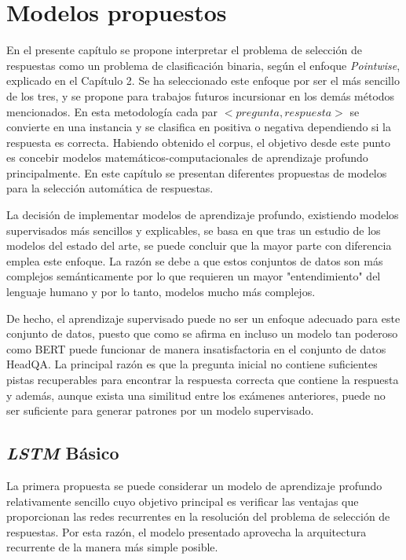 \chapter{Modelos propuestos}\label{chapter:models}

En el presente capítulo se propone interpretar el problema de selección de respuestas como un problema de clasificación binaria, según el enfoque \textit{Pointwise}, explicado en el Capítulo 2. Se ha seleccionado este enfoque por ser el más sencillo de los tres, y se propone para trabajos futuros incursionar en los demás métodos mencionados. En esta metodología cada par $<pregunta, respuesta>$ se convierte en una instancia y se clasifica en positiva o negativa dependiendo si la respuesta es correcta. Habiendo obtenido el corpus, el objetivo desde este punto es concebir modelos matemáticos-computacionales de aprendizaje profundo principalmente. En este capítulo se presentan diferentes propuestas de modelos para la selección automática de respuestas. 

La decisión de implementar modelos de aprendizaje profundo, existiendo modelos supervisados más sencillos y explicables, se basa en que tras un estudio de los modelos del estado del arte, se puede concluir que la mayor parte con diferencia emplea este enfoque. La razón se debe a que estos conjuntos de datos son más complejos semánticamente por lo que requieren un mayor "entendimiento" del lenguaje humano y por lo tanto, modelos mucho más complejos. 

De hecho, el aprendizaje supervisado puede no ser un enfoque adecuado para este conjunto de datos, puesto que como se afirma en \cite{2020-multi-step} incluso un modelo tan poderoso como BERT puede funcionar de manera insatisfactoria en el conjunto de datos HeadQA. La principal razón es que la pregunta inicial no contiene suficientes pistas recuperables para encontrar la respuesta correcta que contiene la respuesta y además, aunque exista una similitud entre los exámenes anteriores, puede no ser suficiente para generar patrones por un modelo supervisado.


\section{\textit{LSTM} Básico}\label{lstm_t}

La primera propuesta se puede considerar un modelo de aprendizaje profundo relativamente sencillo cuyo objetivo principal es verificar las ventajas que proporcionan las redes recurrentes en la resolución del problema de selección de respuestas. Por esta razón, el modelo presentado aprovecha la arquitectura recurrente de la manera más simple posible.

